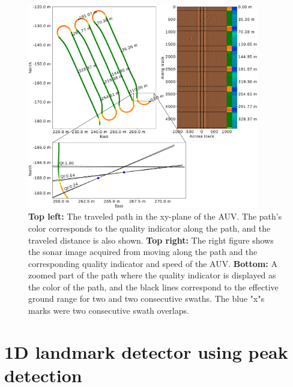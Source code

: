 \begin{figure} [h]%
  \centering
  \includegraphics[trim=0cm 0cm 0cm 0cm, clip=true, width=0.9\textwidth]{figures/quality_indicator_and_path.pdf}
  \caption[Path with quality indicator overlayed]{\textbf{Top left:} The traveled path in the xy-plane of the AUV. The path's color corresponds to the quality indicator along the path, and the traveled distance is also shown. \textbf{Top right:} The right figure shows the sonar image acquired from moving along the path and the corresponding quality indicator and speed of the AUV. \textbf{Bottom:} A zoomed part of the path where the quality indicator is displayed as the color of the path, and the black lines correspond to the effective ground range for two and two consecutive swaths. The blue "x"s marks were two consecutive swath overlaps.}
  \label{fig:path_and_quality_ind}
\end{figure}

\section{1D landmark detector using peak detection}

